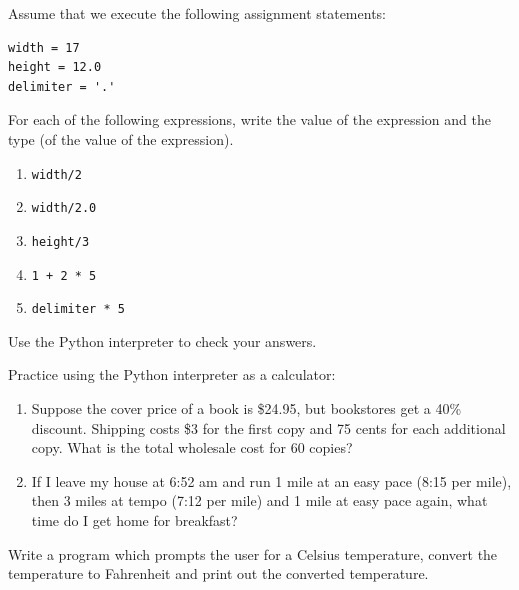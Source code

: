 \documentclass[10pt]{book}
\begin{document}
\begin{ex}
Assume that we execute the following assignment statements:

\begin{verbatim}
width = 17
height = 12.0
delimiter = '.'
\end{verbatim}

For each of the following expressions, write the value of the
expression and the type (of the value of the expression).

\begin{enumerate}

\item {\tt width/2}

\item {\tt width/2.0}

\item {\tt height/3}

\item {\tt 1 + 2 * 5}

\item {\tt delimiter * 5}

\end{enumerate}

Use the Python interpreter to check your answers.
\end{ex}

\begin{ex}
Practice using the Python interpreter as a calculator: 

\begin{enumerate}

\item Suppose the cover price of a book is \$24.95, but bookstores get a
  40\% discount.  Shipping costs \$3 for the first copy and 75 cents
  for each additional copy.  What is the total wholesale cost for
  60 copies?

\item If I leave my house at 6:52 am and run 1 mile at an easy pace
  (8:15 per mile), then 3 miles at tempo (7:12 per mile) and 1 mile at
  easy pace again, what time do I get home for breakfast?


\end{enumerate}
\end{ex}

\begin{ex}
Write a program which prompts the user for a Celsius temperature,
convert the temperature to Fahrenheit and print out the converted
temperature.
\end{ex}
\end{document}
